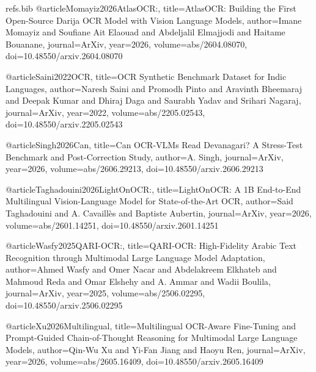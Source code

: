 \begin{filecontents}{refs.bib}
    @article{Momayiz2026AtlasOCR:,
    title={AtlasOCR: Building the First Open-Source Darija OCR Model with Vision Language Models},
    author={Imane Momayiz and Soufiane Ait Elaouad and Abdeljalil Elmajjodi and Haitame Bouanane},
    journal={ArXiv},
    year={2026},
    volume={abs/2604.08070},
    doi={10.48550/arxiv.2604.08070}
    }
    
    @article{Saini2022OCR,
    title={OCR Synthetic Benchmark Dataset for Indic Languages},
    author={Naresh Saini and Promodh Pinto and Aravinth Bheemaraj and Deepak Kumar and Dhiraj Daga and Saurabh Yadav and Srihari Nagaraj},
    journal={ArXiv},
    year={2022},
    volume={abs/2205.02543},
    doi={10.48550/arxiv.2205.02543}
    }
    
    @article{Singh2026Can,
    title={Can OCR-VLMs Read Devanagari? A Stress-Test Benchmark and Post-Correction Study},
    author={A. Singh},
    journal={ArXiv},
    year={2026},
    volume={abs/2606.29213},
    doi={10.48550/arxiv.2606.29213}
    }
    
    @article{Taghadouini2026LightOnOCR:,
    title={LightOnOCR: A 1B End-to-End Multilingual Vision-Language Model for State-of-the-Art OCR},
    author={Said Taghadouini and A. Cavaillès and Baptiste Aubertin},
    journal={ArXiv},
    year={2026},
    volume={abs/2601.14251},
    doi={10.48550/arxiv.2601.14251}
    }
    
    @article{Wasfy2025QARI-OCR:,
    title={QARI-OCR: High-Fidelity Arabic Text Recognition through Multimodal Large Language Model Adaptation},
    author={Ahmed Wasfy and Omer Nacar and Abdelakreem Elkhateb and Mahmoud Reda and Omar Elshehy and A. Ammar and Wadii Boulila},
    journal={ArXiv},
    year={2025},
    volume={abs/2506.02295},
    doi={10.48550/arxiv.2506.02295}
    }
    
    @article{Xu2026Multilingual,
    title={Multilingual OCR-Aware Fine-Tuning and Prompt-Guided Chain-of-Thought Reasoning for Multimodal Large Language Models},
    author={Qin-Wu Xu and Yi-Fan Jiang and Haoyu Ren},
    journal={ArXiv},
    year={2026},
    volume={abs/2605.16409},
    doi={10.48550/arxiv.2605.16409}
    }
    \end{filecontents}
    
    \documentclass{article}
    \usepackage{adjustbox}
    
    
    \section*{\textbf{Small OCR VLM} fine-tuning lowers CER, but \textbf{real-scan robustness} and \textbf{script coverage} still dominate outcomes.}
    
